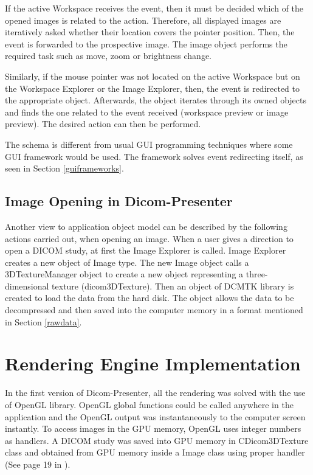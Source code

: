 If the active Workspace receives the event, then it must be decided which of the opened images is related to the action. Therefore, all displayed images are iteratively asked whether their location covers the pointer position. Then, the event is forwarded to the prospective image. The image object performs the required task such as move, zoom or brightness change.

Similarly, if the mouse pointer was not located on the active Workspace but on the Workspace Explorer or the Image Explorer, then, the event is redirected to the appropriate object. Afterwards, the object iterates through its owned objects and finds the one related to the event received (workspace preview or image preview). The desired action can then be performed.

The schema is different from usual GUI programming techniques where some GUI framework would be used. The framework solves event redirecting itself, as seen in Section \ref{guiframeworks}.

\subsection{Image Opening in Dicom-Presenter}

Another view to application object model can be described by the following actions carried out, when opening an image. When a user gives a direction to open a DICOM study, at first the Image Explorer is called. Image Explorer creates a new object of Image type. The new Image object calls a 3DTextureManager object to create a new object representing a three-dimensional texture (dicom3DTexture). Then an object of DCMTK library is created to load the data from the hard disk. The object allows the data to be decompressed and then saved into the computer memory in a format mentioned in Section \ref{rawdata}.


\section{Rendering Engine Implementation}

In the first version of Dicom-Presenter, all the rendering was solved with the use of OpenGL library. OpenGL global functions could be called anywhere in the application and the OpenGL output was instantaneously to the computer screen instantly. To access images in the GPU memory, OpenGL uses integer numbers as handlers. A DICOM study was saved into GPU memory in CDicom3DTexture class and obtained from GPU memory inside a Image class using proper handler (See page 19 in \cite{flaska_bc}).

